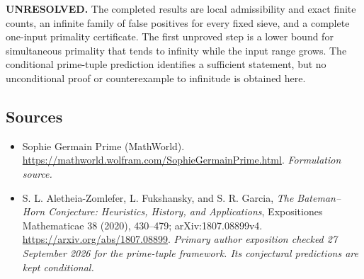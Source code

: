 \documentclass[11pt]{article}
\begin{document}
\textbf{UNRESOLVED.} The completed results are local admissibility and exact finite counts, an infinite family of false positives for every fixed sieve, and a complete one-input primality certificate. The first unproved step is a lower bound for simultaneous primality that tends to infinity while the input range grows. The conditional prime-tuple prediction identifies a sufficient statement, but no unconditional proof or counterexample to infinitude is obtained here.

\subsection{Sources}
\begin{itemize}
\item[S1]Sophie Germain Prime (MathWorld).
\url{https://mathworld.wolfram.com/SophieGermainPrime.html}.
\textit{Formulation source.}
\item[E1] S. L. Aletheia-Zomlefer, L. Fukshansky, and S. R. Garcia, \emph{The Bateman--Horn Conjecture: Heuristics, History, and Applications}, Expositiones Mathematicae 38 (2020), 430--479; arXiv:1807.08899v4.
\url{https://arxiv.org/abs/1807.08899}.
\textit{Primary author exposition checked 27 September 2026 for the prime-tuple framework. Its conjectural predictions are kept conditional.}
\end{itemize}
\end{document}
